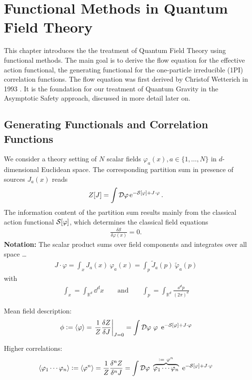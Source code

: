 \chapter{Functional Methods in Quantum Field Theory}
This chapter introduces the the treatment of Quantum Field Theory using functional methods. The main goal is to derive the flow equation for the effective action functional, the generating functional for the one-particle irreducible (1PI) correlation functions. The flow equation was first derived by Christof Wetterich in 1993 \cite{Wetterich1992}. It is the foundation for our treatment of Quantum Gravity in the Asymptotic Safety approach, discussed in more detail later on.
\section{Generating Functionals and Correlation Functions}
We consider a theory setting of $N$ scalar fields $\varphi_a(x), a \in \{1,\dots,N\}$ in $d$-dimensional Euclidean space. The corresponding partition sum in presence of sources $J_a(x)$ reads
\begin{align}
	Z[J] =  \int \D\varphi \operatorname{e}^{-\S + J\cdot\varphi}.
\end{align}
The information content of the partition sum results mainly from the classical action functional $\S$, which determines the classical field equations
\begin{align}
	\frac{\delta \mathcal{S}}{\delta\varphi(x)} = 0.
\end{align}
\textbf{Notation:} The scalar product sums over field components and integrates over all space \dots
\begin{align}
	J\cdot\varphi = \int_x J_a(x) \ \varphi_a(x) = \int_p \tilde{J}_a(p) \ \tilde{\varphi}_a(p)
\end{align}
with
\begin{align}
\int_x = \int_{\mathbb{R}^d} \dd^d x \qquad \text{and} \qquad \int_p = \int_{\mathbb{R}^d} \frac{\dd^d p}{(2\pi)^d}	
\end{align}

Mean field description:
\begin{align}
	\phi := \cf{\varphi} = \eval{\frac{1}{Z}\frac{\delta Z}{\delta J}}_{J=0} = \int \D\varphi \ \varphi \ \operatorname{e}^{-\S + J\cdot\varphi}  
\end{align}

Higher correlations:
\begin{align}
\cf{\varphi_1 \cdots \varphi_n} := \cf{\varphi^n} = \frac{1}{Z}\frac{\delta^n Z}{\delta^n J} = \int \D\varphi \ \overbrace{\varphi_1 \cdots \varphi_n}^{:= \ \varphi^n} \ \operatorname{e}^{-\S + J\cdot\varphi}  
\end{align}

